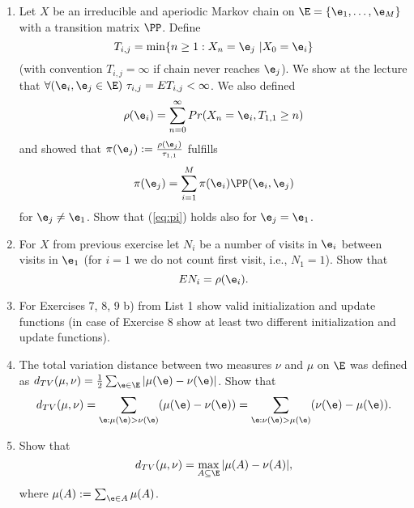 \documentclass[a4paper,12pt]{article}
\begin{document}
 
\noindent
 {
\setlength\fboxsep{4pt}%
 \setlength\fboxrule{2pt}%
 } \bigskip\bigskip
\par \bigskip

 
  

\begin{enumerate}

\item Let $X$ be an irreducible and aperiodic Markov chain on  $\E=\{\e_1,\ldots,\e_M\}$ 
with a transition matrix  $\PP$.
Define 
$$T_{i,j}=\min\{n\geq 1: X_n=\e_j\ | X_0=\e_i\}$$
(with convention $T_{i,j}=\infty$ if chain never reaches $\e_j$).
We show at the lecture that 
$\forall(\e_i,\e_j\in\E) \ \tau_{i,j}=ET_{i,j}<\infty$. We also defined
$$\rho(\e_i)=\sum_{n=0}^\infty Pr(X_n=\e_i, T_{1,1}\geq n)$$
and showed that  $\pi(\e_j):={\rho(\e_j)\over \tau_{1,1}}$ fulfills
\begin{equation}\label{eq:pi}
\pi(\e_j)=\sum_{i=1}^M \pi(\e_i)\PP(\e_i,\e_j)
\end{equation}
for $\e_j\neq \e_1$. Show that (\ref{eq:pi}) holds also for  $\e_j=\e_1$.


\item For $X$ from previous exercise let  $N_i$ be a number 
of visits in  $\e_i$ between visits in  $\e_1$
(for $i=1$ we do not count first visit, i.e., $N_1=1$). Show that 
$$EN_i=\rho(\e_i).$$

\item 
For Exercises   7, 8, 9 b) from List 1 show valid initialization and update functions 
(in case of Exercise 8 show at least two different initialization and update functions).

\item 
The total variation distance between two measures  $\nu$ and $\mu$ on $\E$ 
was defined as $d_{TV}(\mu,\nu)={1\over 2}\sum_{\e\in\E}|\mu(\e)-\nu(\e)|$.
Show that 
$$d_{TV}(\mu,\nu)=  \sum_{\e: \mu(\e)>\nu(\e)} (\mu(\e)-\nu(\e))=\sum_{\e: \nu(\e)>\mu(\e)} (\nu(\e)-\mu(\e)).$$


\item
Show that 
$$ d_{TV}(\mu,\nu)=\max_{A\subseteq \E} |\mu(A)-\nu(A)|,$$
where $\mu(A):=\sum_{\e\in A}\mu(A)$.


\end{enumerate}
\end{document}
